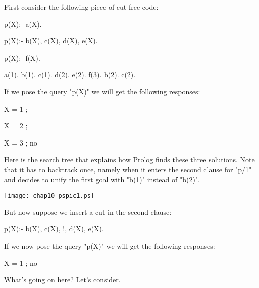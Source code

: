 First consider the following piece of cut-free code:
\begin{LPNcodedisplay}
p(X):- a(X).

p(X):- b(X), c(X), d(X), e(X).

p(X):- f(X).

a(1).  b(1).   c(1).   d(2).  e(2).  f(3).
       b(2).   c(2).
\end{LPNcodedisplay}

If we pose the query "p(X)" we will get the following
responses:
\begin{LPNcodedisplay}
X = 1 ;

X = 2 ;

X = 3 ;
no
\end{LPNcodedisplay}

Here is the search tree that explains how Prolog finds these three
solutions. Note that it has to backtrack once, namely when it enters
the second clause for "p/1" and decides to unify the first goal with
"b(1)" instead of "b(2)".

\begin{center}
\texttt{[image: chap10-pspic1.ps]}
\end{center}

But now suppose we insert a cut in the second clause:
\begin{LPNcodedisplay}
p(X):- b(X), c(X), !, d(X), e(X).
\end{LPNcodedisplay}

If we now pose the query "p(X)" we will get the following
responses:
\begin{LPNcodedisplay}
X = 1 ;
no
\end{LPNcodedisplay}

What's going on here? Let's consider.

